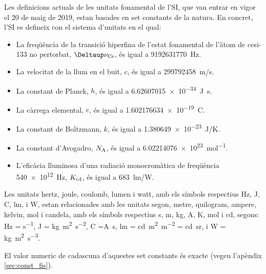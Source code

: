 Les definicions actuals de les unitats fonamental de l'SI, que van entrar en vigor el 20 de maig de 2019, estan basades en set constants de la natura. En concret, l'SI es defineix con el  sistema d'unitats en el qual:
\begin{itemize}

\item La freqüència de la transició hiperfina de l'estat fonamental de l'àtom de cesi-133 no pertorbat, $\Deltaup\nu\ped{Cs}$, és igual a \SI{9 192 631 770}{Hz}.
\item La velocitat de la llum en el buit, $c$, és igual a \SI{299792458}{m/s}.
\item La constant de Planck, $h$, és igual a \SI{6,62607015 e-34}{J.s}.
\item La càrrega elemental, $e$, és igual a \SI{1,602176634 e-19}{C}.
\item La constant de Boltzmann, $k$, és igual a \SI{1,380649e-23}{J/K}.
\item La constant d'Avogadro, $N_\mathrm{A}$, és igual a \SI{6,02214076 e23}{mol^{-1}}.
\item L'eficàcia lluminosa d'una radiació monocromàtica de freqüència \SI{540e12}{Hz},  $K_\mathrm{cd}$, és igual a \SI{683}{lm/W}.
\end{itemize}
 
 


Les unitats  hertz, joule, coulomb, lumen i watt, amb els símbols respectius Hz, J, C, lm, i W, estan relacionades amb les unitats segon, metre, quilogram, ampere, kelvin, mol i candela, amb els símbols respectius s, m, kg, A, K, mol i cd, segons:  Hz = \si{s^{-1}}, J = \si{kg.m^2.s^{-2}}, C =\si{A.s}, lm = \si{cd.m^2.m^{-2}} = \si{cd.sr}, i W = \si{kg.m^2.s^{-3}}.

El valor numeric de cadascuna d'aquestes set constants és exacte (vegeu l'apèndix \vref{sec:const_fis}).

